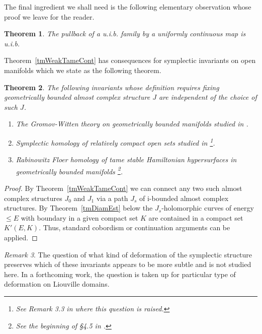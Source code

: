 \documentclass[11pt]{amsart}
\newtheorem{tm}{Theorem}[section]
\theoremstyle{definition}
\theoremstyle{remark}
\newtheorem{rem}[tm]{Remark}
\begin{document}
The final ingredient we shall need is the following elementary observation whose proof we leave for the reader.
\begin{tm}\label{tmPullbackTame}
The pullback of a u.i.b. family by a uniformly continuous map is u.i.b.
\end{tm}
Theorem~\ref{tmWeakTameCont} has consequences for symplectic invariants on open manifolds which we state as the following theorem.
\begin{tm}\label{TmSympInvGWSH}
The following invariants whose definition requires fixing geometrically bounded almost complex structure $J$ are independent of the choice of such $J$.
\begin{enumerate}
\item
The Gromov-Witten theory on geometrically bounded manifolds studied in \cite{Lu06}.
\item
Symplectic homology of relatively compact open sets studied in \cite{CielGinzKer}\footnote{See Remark 3.3 in \cite{CielGinzKer} where this question is raised.}.
\item
Rabinowitz Floer homology of tame stable Hamiltonian hypersurfaces in geometrically bounded manifolds \cite{cieliebak2010}\footnote{See the beginning of \S 4.5 in \cite{cieliebak2010}.}.
\end{enumerate}
\end{tm}
\begin{proof}
By Theorem~\ref{tmWeakTameCont} we can connect any two such almost complex structures $J_0$ and $J_1$ via a path $J_s$ of i-bounded almost complex structures. By Theorem~\ref{tmDiamEst} below the $J_s$-holomorphic curves of energy $\leq E$ with boundary in a given compact set $K$ are contained in a compact set $K'(E,K)$. Thus, standard cobordism or continuation arguments can be applied.
\end{proof}
\begin{rem}\label{rmGW}
The question of what kind of deformation of the symplectic structure preserves which of these invariants appears to be more subtle and is not studied here. In a forthcoming work, the question is taken up for particular type of deformation on Liouville domains.
\end{rem}
\end{document}
